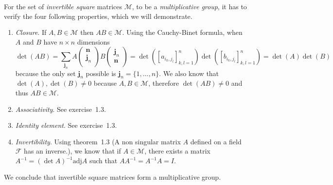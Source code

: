 \begin{solution}
  For the set of \emph{invertible square} matrices $\mathcal{M}$,
  to be a \emph{multiplicative group}, it has to verify the four following properties,
  which we will demonstrate.
  \begin{enumerate}
    \item \emph{Closure}. If $A,B \in \mathcal{M}$ then $AB \in \mathcal{M}$.
    Using the Cauchy-Binet formula, when $A$ and $B$ have $n \times n$ dimensions
    \[
      \det(AB) = \sum_{\mathbf{j}_n}
      A
      \begin{pmatrix}
        \mathbf{n} \\
        \mathbf{j}_n \\
      \end{pmatrix}
      B
      \begin{pmatrix}
        \mathbf{j}_n \\
        \mathbf{n} \\
      \end{pmatrix}
      =\det\left([a_{i_k,j_l}]_{k,l=1}^{n}\right) \det\left([b_{i_k,j_l}]_{k,l=1}^{n}\right) 
      =\det(A) \det(B)
    \]
    because the only set $\mathbf{j}_n$ possible is $\mathbf{j}_n = \{1,\dots,n\}$.
    We also know that $\det(A), \det(B) \neq 0$ because $A, B \in \mathcal{M}$,
    therefore $\det(AB) \neq 0$ and thus $AB \in \mathcal{M}$.
    \item \emph{Associativity}. See exercise~1.3.
    \item \emph{Identity element}. See exercise~1.3.
    \item \emph{Invertibility}. Using theorem~1.3 (A non singular matrix $A$ defined on a 
    field $\mathcal{F}$ has an inverse.),
    we know that if $A \in \mathcal{M}$,
    there exists a matrix $A^{-1} = (\det A)^{-1} \text{adj}A$ 
    such that $A A^{-1} = A^{-1} A = I$.
  \end{enumerate}
  We conclude that invertible square matrices form a multiplicative group.
\end{solution}

